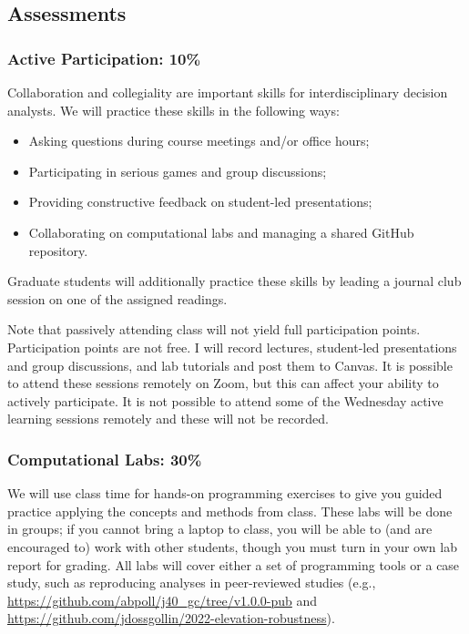 \documentclass[
  11pt,
]{article}
\providecommand{\tightlist}{%
  \setlength{\itemsep}{0pt}\setlength{\parskip}{0pt}}\usepackage{longtable,booktabs,array}
\begin{document}
\subsection{Assessments}\label{assessments}

\subsubsection{Active Participation:
10\%}\label{active-participation-10}

Collaboration and collegiality are important skills for
interdisciplinary decision analysts. We will practice these skills in
the following ways:

\begin{itemize}
\tightlist
\item
  Asking questions during course meetings and/or office hours;
\item
  Participating in serious games and group discussions;
\item
  Providing constructive feedback on student-led presentations;
\item
  Collaborating on computational labs and managing a shared GitHub
  repository.
\end{itemize}

Graduate students will additionally practice these skills by leading a
journal club session on one of the assigned readings.

Note that passively attending class will not yield full participation
points. Participation points are not free. I will record lectures,
student-led presentations and group discussions, and lab tutorials and
post them to Canvas. It is possible to attend these sessions remotely on
Zoom, but this can affect your ability to actively participate. It is
not possible to attend some of the Wednesday active learning sessions
remotely and these will not be recorded.

\subsubsection{Computational Labs: 30\%}\label{computational-labs-30}

We will use class time for hands-on programming exercises to give you
guided practice applying the concepts and methods from class. These labs
will be done in groups; if you cannot bring a laptop to class, you will
be able to (and are encouraged to) work with other students, though you
must turn in your own lab report for grading. All labs will cover either
a set of programming tools or a case study, such as reproducing analyses
in peer-reviewed studies (e.g.,
\url{https://github.com/abpoll/j40_gc/tree/v1.0.0-pub} and
\url{https://github.com/jdossgollin/2022-elevation-robustness}).
\end{document}
